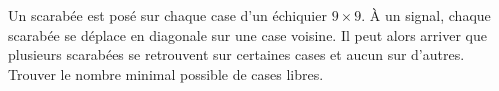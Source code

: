 Un scarabée est posé sur chaque case d'un échiquier $9 \times 9$. À un signal, chaque scarabée se déplace en diagonale sur une case voisine. Il peut alors arriver que plusieurs scarabées se retrouvent sur certaines cases et aucun sur d'autres. Trouver le nombre minimal possible de cases libres.
